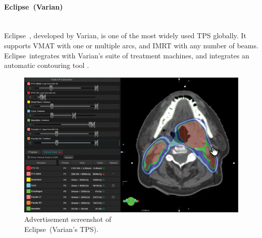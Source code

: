 \begin{multicols}{2}
	\paragraph{Eclipse\texttrademark\ (Varian)}
	\ \\
	Eclipse\texttrademark\ \cite{eclipse}, developed by Varian, is one of the most widely used TPS globally.
	It supports VMAT with one or multiple arcs, and IMRT with any number of beams.
	Eclipse\texttrademark\ integrates with Varian's suite of treatment machines, and integrates an automatic contouring tool \cite{eclipse_brochure}.
	
	\columnbreak
	
	\begin{figure}[H]
		\centering
		\captionsetup{width=\linewidth}
		\includegraphics[width=\linewidth]{EclipseVarian.png}
		\caption{Advertisement screenshot of \\ Eclipse\texttrademark\ (Varian's TPS).}
		\label{fig:screenshot_eclipse}
	\end{figure}
\end{multicols}

